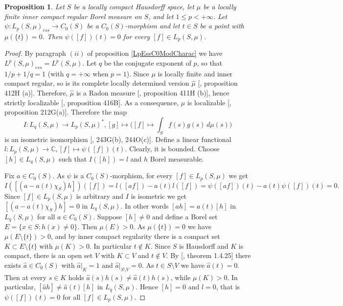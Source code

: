 \documentclass[12pt]{article}
\newtheorem{proposition}[theorem]{Proposition}
\begin{document}
\begin{proposition}\label{MorphLpC0Prop} Let $S$ be a locally compact Hausdorff 
    space, let $\mu$ be a locally finite inner compact regular Borel measure 
    on $S$, and let $1\leq p<+\infty$. Let $\psi: L_p(S,\mu)_{ess}\to C_0(S)$ be 
    a $C_0(S)$-morphism and let $t\in S$ be a point with $\mu(\{t\})=0$. 
    Then $\psi([f])(t)=0$ for every $[f]\in L_p(S,\mu)$.
\end{proposition}
\begin{proof} By paragraph $(ii)$ of proposition \ref{LpEssC0ModCharac} we 
    have $L^p(S,\mu)_{ess}=L^p(S,\mu)$. Let $q$ be the conjugate exponent 
    of $p$, so that $1/p+1/q=1$ (with $q=+\infty$ when $p=1$). Since $\mu$ is 
    locally finite and inner compact regular, so is its complete locally 
    determined version $\hat{\mu}$ [\cite{FremMeasTh4.1}, proposition 412H (a)]. 
    Therefore, $\hat{\mu}$ is a Radon 
    measure [\cite{FremMeasTh4.1}, proposition 411H (b)], hence strictly 
    localizable [\cite{FremMeasTh4.1}, proposition 416B]. As a consequence, 
    $\mu$ is localizable [\cite{FremMeasTh2}, proposition 212G(a)]. 
    Therefore the map
    $$
        I:L_q(S,\mu)\to L_p(S,\mu)^*,
        [g]\mapsto\Big([f]\mapsto\int_S f(s)g(s)\,d\mu(s)\Big)
    $$
    is an isometric isomorphism [\cite{FremMeasTh2}, 243G(b), 244O(c)]. 
    Define a linear functional 
    $l: L_p(S,\mu)\to\mathbb{C}, [f]\mapsto\psi([f])(t)$. Clearly, it is 
    bounded. Choose $[h]\in L_q(S,\mu)$ such that $I([h])=l$ and 
    $h$ Borel measurable.

    Fix $a\in C_0(S)$. As $\psi$ is a $C_0(S)$-morphism, for 
    every $[f]\in L_p(S,\mu)$ we get
    $$
        I([(a-a(t)\chi_S)h])([f])
        =l([af])-a(t)l([f])
        =\psi([af])(t)-a(t)\psi([f])(t)=0.
    $$
    Since $[f]\in L_p(S, \mu)$ is arbitrary and $I$ is isometric we 
    get $[(a-a(t)\chi_S)h]=0$ in $L_q(S, \mu)$. In other words $[ah]=a(t)[h]$ 
    in $L_q(S, \mu)$ for all $a\in C_0(S)$. Suppose $[h]\neq 0$ and 
    define a Borel set $E=\{x\in S:h(x)\neq 0\}$. Then $\mu(E)>0$. 
    As $\mu(\{t\})=0$ we have $\mu(E\setminus \{t\})>0$, and by inner compact 
    regularity there is a compact set $K\subset E\setminus \{t\}$ 
    with $\mu(K)>0$. In particular $t\notin K$. Since $S$ is Hausdorff and $K$ 
    is compact, there is an open set $V$ with $K\subset V$ and $t\notin V$. 
    By [\cite{DalesBanSpContFunDualSp}, theorem 1.4.25] there 
    exists $\hat{a}\in C_0(S)$ with $\hat{a}|_K=1$ 
    and $\hat{a}|_{S\setminus V}=0$. As $t\in S\setminus V$ we 
    have $\hat{a}(t)=0$. Then at every $s\in K$ 
    holds $\hat{a}(s) h(s)\neq \hat{a}(t)h(s)$, while $\mu(K)>0$. In particular,
    $[\hat{a}h]\neq \hat{a}(t)[h]$ in $L_q(S,\mu)$. Hence $[h]=0$ and $l=0$, 
    that is $\psi([f])(t)=0$ for all $[f]\in L_p(S,\mu)$.
\end{proof}
\end{document}
